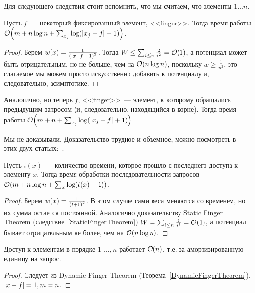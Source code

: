Для следующего следствия стоит вспомнить, что мы считаем, что элементы $1 \ldots n$.

\begin{corollary}\label{StaticFingerTheorem}
	Пусть $f$~--- некоторый фиксированный элемент, <<finger>>.
	Тогда время работы $\BigO \parens*{m + n \log n + \sum_{x_j} \log \parens*{\abs*{x_j - f} + 1}}$.
\end{corollary}
\begin{proof}
	Берем $w(x) = \frac{1}{\parens*{\abs*{x - f} + 1}^2}$. Тогда $W \leq \sum_{i \leq n} \frac{2}{i^2} = \BigO(1)$, а потенциал может быть отрицательным, но не больше, чем на $\BigO(n \log n)$, поскольку $w \geq \frac{1}{n^2}$, это слагаемое мы можем просто искусственно добавить к потенциалу и, следовательно, асимптотике.
\end{proof}

\begin{theorem}\label{DynamicFingerTheorem}
	Аналогично, но теперь $f$, <<finger>>~--- элемент, к которому обращались предыдущим запросом (и, следовательно, находящийся в корне).
	Тогда время работы $\BigO \parens*{m + n + \sum_{x_j} \log \parens*{\abs*{x_j - f} + 1}}$.
\end{theorem}
Мы не доказывали. Доказательство трудное и объемное, можно посмотреть в этих двух статьях:~\cite{cole2000dfc1,cole2000dfc2}.

\begin{corollary}
	Пусть $t(x)$~--- количество времени, которое прошло с последнего доступа к элементу $x$. Тогда время обработки последовательности запросов $\BigO \parens*{m + n \log n + \sum_{x} \log \parens*{t(x) + 1}}$.
\end{corollary}
\begin{proof}
	Берем $w(x) = \frac{1}{\parens*{t + 1}^2}$. В этом случае сами веса меняются со временем, но их сумма остается постоянной. Аналогично доказательству Static Finger Theorem (следствие~\ref{StaticFingerTheorem}) $W = \sum_{i \leq n} \frac{1}{i^2} = \BigO(1)$, а потенциал бывает отрицательным не более, чем на $\BigO(n \log n)$.
\end{proof}

\begin{theorem}
	Доступ к элементам в порядке $1, \ldots, n$ работает $\BigO(n)$, т.е. за амортизированную единицу на запрос.
\end{theorem}
\begin{proof}
	Следует из Dynamic Finger Theorem (Теорема~\ref{DynamicFingerTheorem}). $\abs{x - f} = 1, m = n$.
\end{proof}
